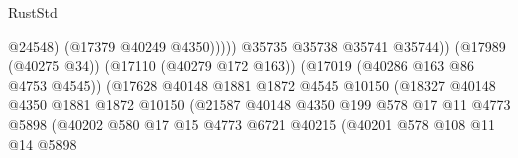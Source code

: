 \begin{lexlean}{RustStd}
\begin{coremodule}
                                                              @24548)
                                                            (@17379 @40249 @4350)))))
                                                    @35735
                                                    @35738
                                                    @35741
                                                    @35744))
                                                (@17989 (@40275 @34))
                                                (@17110 (@40279 @172 @163))
                                                (@17019 (@40286 @163 @86 @4753 @4545))
                                                (@17628
                                                  @40148
                                                  @1881
                                                  @1872
                                                  @4545
                                                  @10150
                                                  (@18327
                                                    @40148
                                                    @4350
                                                    @1881
                                                    @1872
                                                    @10150
                                                    (@21587
                                                      @40148
                                                      @4350
                                                      @199
                                                      @578
                                                      @17
                                                      @11
                                                      @4773
                                                      @5898
                                                      (@40202
                                                        @580
                                                        @17
                                                        @15
                                                        @4773
                                                        @6721
                                                        @40215
                                                        (@40201
                                                          @578
                                                          @108
                                                          @11
                                                          @14
                                                          @5898

\end{coremodule}
\end{lexlean}
